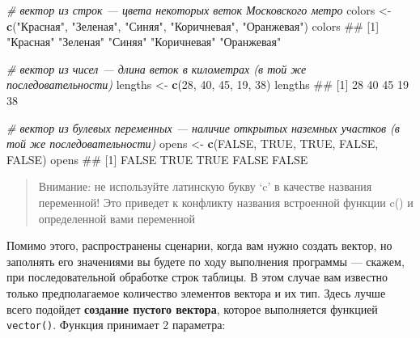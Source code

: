 \documentclass[]{book}
\newenvironment{Shaded}{\begin{snugshade}}{\end{snugshade}}
\newcommand{\KeywordTok}[1]{\textcolor[rgb]{0.13,0.29,0.53}{\textbf{#1}}}
\newcommand{\DecValTok}[1]{\textcolor[rgb]{0.00,0.00,0.81}{#1}}
\newcommand{\StringTok}[1]{\textcolor[rgb]{0.31,0.60,0.02}{#1}}
\newcommand{\CommentTok}[1]{\textcolor[rgb]{0.56,0.35,0.01}{\textit{#1}}}
\newcommand{\OtherTok}[1]{\textcolor[rgb]{0.56,0.35,0.01}{#1}}
\newcommand{\NormalTok}[1]{#1}
\begin{document}
\begin{Shaded}
\begin{Highlighting}[]
\CommentTok{# вектор из строк — цвета некоторых веток Московского метро}
\NormalTok{colors <-}\StringTok{ }\KeywordTok{c}\NormalTok{(}\StringTok{"Красная"}\NormalTok{, }\StringTok{"Зеленая"}\NormalTok{, }\StringTok{"Синяя"}\NormalTok{, }\StringTok{"Коричневая"}\NormalTok{, }\StringTok{"Оранжевая"}\NormalTok{)}
\NormalTok{colors}
\NormalTok{## [1] "Красная"    "Зеленая"    "Синяя"      "Коричневая" "Оранжевая"}
\end{Highlighting}
\end{Shaded}

\begin{Shaded}
\begin{Highlighting}[]
\CommentTok{# вектор из чисел — длина веток в километрах (в той же последовательности)}
\NormalTok{lengths <-}\StringTok{ }\KeywordTok{c}\NormalTok{(}\DecValTok{28}\NormalTok{, }\DecValTok{40}\NormalTok{, }\DecValTok{45}\NormalTok{, }\DecValTok{19}\NormalTok{, }\DecValTok{38}\NormalTok{)}
\NormalTok{lengths}
\NormalTok{## [1] 28 40 45 19 38}
\end{Highlighting}
\end{Shaded}

\begin{Shaded}
\begin{Highlighting}[]
\CommentTok{# вектор из булевых переменных — наличие  открытых наземных участков (в той же последовательности)}
\NormalTok{opens <-}\StringTok{ }\KeywordTok{c}\NormalTok{(}\OtherTok{FALSE}\NormalTok{, }\OtherTok{TRUE}\NormalTok{, }\OtherTok{TRUE}\NormalTok{, }\OtherTok{FALSE}\NormalTok{, }\OtherTok{FALSE}\NormalTok{)}
\NormalTok{opens}
\NormalTok{## [1] FALSE  TRUE  TRUE FALSE FALSE}
\end{Highlighting}
\end{Shaded}

\begin{quote}
Внимание: не используйте латинскую букву `c' в качестве названия
переменной! Это приведет к конфликту названия встроенной функции c() и
определенной вами переменной
\end{quote}

Помимо этого, распространены сценарии, когда вам нужно создать вектор,
но заполнять его значениями вы будете по ходу выполнения программы ---
скажем, при последовательной обработке строк таблицы. В этом случае вам
известно только предполагаемое количество элементов вектора и их тип.
Здесь лучше всего подойдет \textbf{создание пустого вектора}, которое
выполняется функцией \texttt{vector()}. Функция принимает 2 параметра:
\end{document}

